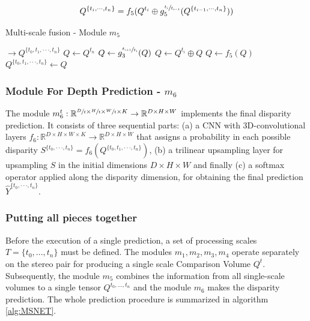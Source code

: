 \documentclass[runningheads]{llncs}
\begin{document}
\begin{equation} \label{eq:two_scale_fusion}
Q^{ \{ t_i, \cdot \cdot \cdot, t_{n} \} } = f_5(Q^{t_i} \oplus g_5^{\sfrac{t_i}{t_{i-1}} }(Q^{ \{ t_{i-1}, \cdot \cdot \cdot, t_n \} }))
\end{equation}

\begin{algorithm}
\caption{Multi-scale fusion - Module $m_5$}\label{alg:multi_scale_fusion}
\begin{algorithmic}[1]
 $\rightarrow Q^{\{t_0, t_1, \cdot \cdot \cdot, t_n\}}$ 
\State $Q \gets Q^{t_n}$ 
\State $Q \gets g_3^{\sfrac{ t_{i+1} }{ t_i } }(Q)$ 
\State $Q \gets Q^{t_i} \oplus Q$ 
\State $Q \gets f_5(Q)$ 
\EndFor
\State \Return $Q^{\{t_0, t_1, \cdot \cdot \cdot, t_n\}} \gets Q$ 
\EndProcedure
\end{algorithmic}
\end{algorithm}


\subsubsection{Module For Depth Prediction - $m_6$}

The module $m_6^t: \mathbb{R}^{\sfrac{D}{t} \times \sfrac{H}{t} \times \sfrac{W}{t} \times K} \rightarrow \mathbb{R}^{D \times H \times W}$ implements the final disparity prediction. It consists of three sequential parts: (a) a CNN with 3D-convolutional layers $f_6: \mathbb{R}^{D \times H \times W \times K} \rightarrow \mathbb{R}^{D \times H \times W}$ that assigns a probability in each possible disparity $S^{\{ t_0, \cdot \cdot \cdot, t_n \}} = f_6(Q^{\{t_0, t_1, \cdot \cdot \cdot, t_n\}})$, (b) a trilinear upsampling layer for upsampling $S$ in the initial dimensions $D \times H \times W$ and finally (c) a softmax operator applied along the disparity dimension, for obtaining the final prediction $\hat{Y}^{\{t_0, \cdot \cdot \cdot, t_n\}}$.

\subsubsection{Putting all pieces together}

Before the execution of a single prediction, a set of processing scales $T = \{t_0, ..., t_n\}$ must be defined. The modules $m_1, m_2, m_3, m_4$ operate separately on the stereo pair for producing a single scale Comparison Volume $Q^t$. Subsequently, the module $m_5$ combines the information from all single-scale volumes to a single tensor $Q^{t_0, ..., t_n}$ and the module $m_6$ makes the disparity prediction. The whole prediction procedure is summarized in algorithm \ref{alg:MSNET}.
\end{document}
